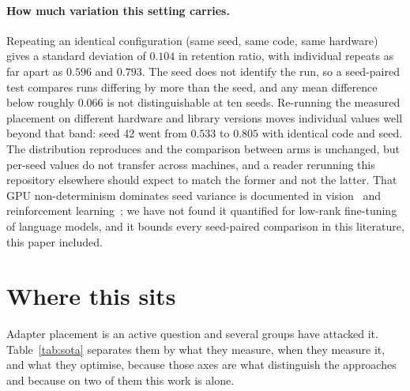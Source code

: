 \documentclass[11pt]{article}
\begin{document}
\paragraph{How much variation this setting carries.}
\label{sec:noise}
Repeating an identical configuration (same seed, same code, same hardware)
gives a standard deviation of $0.104$ in retention ratio, with individual repeats
as far apart as $0.596$ and $0.793$. The seed does not identify the run, so a
seed-paired test compares runs differing by more than the seed, and any mean
difference below roughly $0.066$ is not distinguishable at ten seeds.
Re-running the measured placement on different hardware and library versions moves
individual values well beyond that band: seed 42 went from $0.533$ to $0.805$ with
identical code and seed. The distribution reproduces and the comparison between arms is
unchanged, but per-seed values do not transfer across machines, and a reader rerunning
this repository elsewhere should expect to match the former and not the latter. That GPU
non-determinism dominates seed variance is documented in vision~\cite{morin2020}
and reinforcement learning~\cite{nagarajan2018}; we have not found it quantified
for low-rank fine-tuning of language models, and it bounds every seed-paired
comparison in this literature, this paper included.

\section{Where this sits}
\label{sec:sota}

Adapter placement is an active question and several groups have attacked it.
Table~\ref{tab:sota} separates them by what they measure, when they measure it,
and what they optimise, because those axes are what distinguish the approaches
and because on two of them this work is alone.
\end{document}
